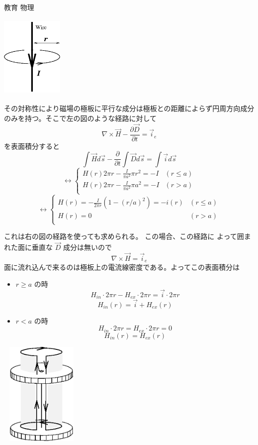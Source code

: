 \documentclass[fleqn]{jbook}
\begin{document}
\begin{answer}{教育 物理}{}
\begin{subanswers}
\begin{subsubanswers}
\parbox[t]{40mm}{
\begin{center}
\includegraphics[clip,height=40mm,width=30mm]{1992phys-4.eps}
\end{center}}\parbox[t]{120mm}{
その対称性により磁場の極板に平行な成分は極板との距離によらず円周方向成分
のみを持つ。そこで左の図のような経路に対して
\[ \nabla \times \vec{H} - \frac{\partial \vec{D}}{\partial t} = \vec{i}_{e} \]
を表面積分すると
\[ \int \vec{H}d\vec{s} - \frac{\partial}{\partial t}\int \vec{D}d\vec{s} = \int \vec{i} d\vec{s} \]
\[ \leftrightarrow \begin{cases}
        H(r)2\pi r - \frac{I}{\pi a^{2}} \pi r^{2}= -I &(r\le a) \\
        H(r)2\pi r - \frac{I}{\pi a^{2}} \pi a^{2}= -I &(r > a) \\
        \end{cases}\]
\[ \leftrightarrow \begin{cases}
        H(r)=-\frac{I}{2\pi r} \left(1-\left(r/a\right)^2\right)=-i(r) & (r\le a) \\ 
       H(r)=0 & (r > a) \\
        \end{cases}\]
        }
\parbox[t]{110mm}{
これは右の図の経路を使っても求められる。
この場合、この経路に
よって囲まれた面に垂直な $\vec{D}$ 成分は無いので
\[ \nabla \times \vec{H} = \vec{i}_{e} \]
面に流れ込んで来るのは極板上の電流線密度である。よってこの表面積分は
\begin{itemize}
\item $r \ge a $ の時 
\[ H_{in}\cdot 2\pi r - H_{ex} \cdot 2\pi r = \vec{i} \cdot 2\pi r \]
\[ H_{in}(r) = \vec{i} + H_{ex} (r) \]
\item $r < a $ の時 
\[ H_{in} \cdot 2\pi r = H_{ex} \cdot 2\pi r = 0 \]
\[ H_{in} (r) = H_{ex}(r) \]
\end{itemize}}\parbox[t]{50mm}{
\begin{center}
\includegraphics[clip,height=50mm,width=40mm]{1992phys-5.eps}
\end{center}}


\end{subsubanswers}
\end{subanswers}
\end{answer}
\end{document}
